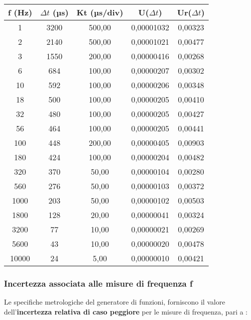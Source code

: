 \begin{table}[!ht]
    \centering
    \begin{tabular}{|c|c|c|c|c|}
    \hline
        \textbf{f (Hz)} & \textbf{$\Delta t$ (µs)} & \textbf{Kt (µs/div)} & \textbf{U($\Delta t$)} & \textbf{Ur($\Delta t$)} \\ \hline
        1 & 3200 & 500,00 & 0,00001032 & 0,00323 \\ \hline
        2 & 2140 & 500,00 & 0,00001021 & 0,00477 \\ \hline
        3 & 1550 & 200,00 & 0,00000416 & 0,00268 \\ \hline
        6 & 684 & 100,00 & 0,00000207 & 0,00302 \\ \hline
        10 & 592 & 100,00 & 0,00000206 & 0,00348 \\ \hline
        18 & 500 & 100,00 & 0,00000205 & 0,00410 \\ \hline
        32 & 480 & 100,00 & 0,00000205 & 0,00427 \\ \hline
        56 & 464 & 100,00 & 0,00000205 & 0,00441 \\ \hline
        100 & 448 & 200,00 & 0,00000405 & 0,00903 \\ \hline
        180 & 424 & 100,00 & 0,00000204 & 0,00482 \\ \hline
        320 & 370 & 50,00 & 0,00000104 & 0,00280 \\ \hline
        560 & 276 & 50,00 & 0,00000103 & 0,00372 \\ \hline
        1000 & 203 & 50,00 & 0,00000102 & 0,00503 \\ \hline
        1800 & 128 & 20,00 & 0,00000041 & 0,00324 \\ \hline
        3200 & 77 & 10,00 & 0,00000021 & 0,00269 \\ \hline
        5600 & 43 & 10,00 & 0,00000020 & 0,00478 \\ \hline
        10000 & 24 & 5,00 & 0,00000010 & 0,00421 \\ \hline
    \end{tabular}
\end{table}
\FloatBarrier
\clearpage

\subsubsection*{Incertezza associata alle misure di frequenza f}
Le specifiche metrologiche del generatore di funzioni, forniscono il valore dell'\textbf{incertezza relativa di caso peggiore} per le misure di frequenza, pari a :

